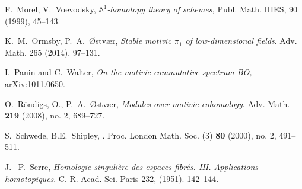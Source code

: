\documentclass[a4paper,12pt,draft]{amsart}
\theoremstyle{definition}
\theoremstyle{remark}
\begin{document}
\begin{thebibliography}{XXXX}
F.~Morel, V.~Voevodsky,
\emph{${{\mathbb A}}^1$-homotopy theory of schemes,}
Publ. Math. IHES, 90 (1999), 45--143.

K.~M.~Ormsby, P.~A.~{\O}stv{\ae}r, 
\emph{Stable motivic $\pi_1$ of low-dimensional fields}. Adv. Math. 265 (2014), 97--131.

I.~Panin and C.~Walter,
\emph{On the motivic commutative spectrum BO,}
arXiv:1011.0650.

O.~R\"ondigs, O., P.~A.~{\O}stv{\ae}r,  {\sl Modules over motivic cohomology}. Adv. Math. {\bf 219} (2008), no. 2, 689--727.

S.~Schwede, B.E.~Shipley, 
. Proc. London
Math. Soc. (3) {\bf 80} (2000), no. 2, 491--511.

J.~-P.~Serre,
\emph{Homologie singuli\`ere des espaces fibr\'es. III. Applications homotopiques}.  C. R. Acad. Sci. Paris 232, (1951). 142--144.
\end{thebibliography}
\end{document}
